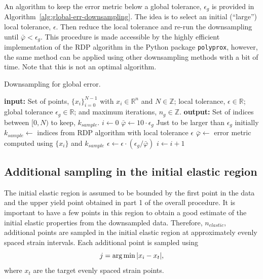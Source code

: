 \documentclass[a4paper,11pt]{article}
\begin{document}
An algorithm to keep the error metric below a global tolerance, $\epsilon_g$ is provided in Algorithm~\ref{alg:global-err-downsampling}.
The idea is to select an initial (``large'') local tolerance, $\epsilon$.
Then reduce the local tolerance and re-run the downsampling until $\bar{\varphi} < \epsilon_{g}$.
This procedure is made accessible by the highly efficient implementation of the RDP algorithm in the Python package \texttt{polyprox}, however, the same method can be applied using other downsampling methods with a bit of time.
Note that this is not an optimal algorithm.

\begin{algorithm}
	\caption{Downsampling for global error.}
	\label{alg:global-err-downsampling}
	\begin{algorithmic}[1]
		\State \textbf{input:} Set of points, $\{x_i\}_{i=0}^{N-1}$ with $x_i \in \mathbb{R}^n$ and $N \in \mathbb{Z}$; local tolerance, $\epsilon \in \mathbb{R}$;
        global tolerance $\epsilon_g \in \mathbb{R}$; and maximum iterations, $n_g \in \mathbb{Z}$.
        \State \textbf{output:} Set of indices between $[0, N)$ to keep, $k_{sample}$.
        \State $i \gets 0$
        \State $\bar{\varphi} \gets 10 \cdot \epsilon_g$
        \Comment Just to be larger than $\epsilon_g$ initially
            \State $k_{sample} \gets$ indices from RDP algorithm with local tolerance $\epsilon$
            \State $\bar{\varphi} \gets$ error metric computed using $\{x_i\}$ and $k_{sample}$
                \State $\epsilon \gets \epsilon \cdot (\epsilon_g / \bar{\varphi})$
                \State $i \gets i + 1$
            \EndIf
		\EndWhile
\end{algorithmic}
\end{algorithm}

\subsection{Additional sampling in the initial elastic region}

The initial elastic region is assumed to be bounded by the first point in the data and the upper yield point obtained in part 1 of the overall procedure.
It is important to have a few points in this region to obtain a good estimate of the initial elastic properties from the downsampled data.
Therefore, $n_{elastic}$, additional points are sampled in the initial elastic region at approximately evenly spaced strain intervals.
Each additional point is sampled using
\begin{equation}
    j = \arg \min \abs{x_i - x_{t}},
\end{equation}
where $x_t$ are the target evenly spaced strain points.
\end{document}
